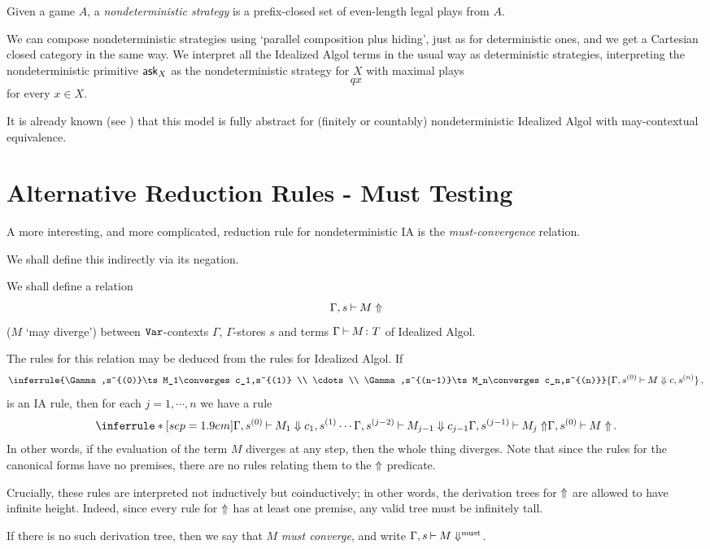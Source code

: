 \documentclass[11pt]{report}
\begin{document}
\begin{definition}
  Given a game $A$, a \emph{nondeterministic strategy} is a prefix-closed set of even-length legal plays from $A$.
\end{definition}

We can compose nondeterministic strategies using `parallel composition plus hiding', just as for deterministic ones, and we get a Cartesian closed category in the same way.  
We interpret all the Idealized Algol terms in the usual way as deterministic strategies, interpreting the nondeterministic primitive $\operatorname{{\mathsf{ask}}}_X$ as the nondeterministic strategy for $X$ with maximal plays
\[
  qx
  \]
for every $x\in X$.

It is already known (see \cite{mcCHFiniteND}) that this model is fully abstract for (finitely or countably) nondeterministic Idealized Algol with may-contextual equivalence.

\section{Alternative Reduction Rules - Must Testing}

A more interesting, and more complicated, reduction rule for nondeterministic IA is the \emph{must-convergence} relation.

We shall define this indirectly via its negation.

\begin{definition}
  We shall define a relation
  \[
    \Gamma,s\mathbin{\vdash} M\Uparrow
    \]
  ($M$ `may diverge') between ${\mathtt{Var}}$-contexts $\Gamma$, $\Gamma$-stores $s$ and terms $\Gamma\mathbin{\vdash} M\colon T$ of Idealized Algol.

  The rules for this relation may be deduced from the rules for Idealized Algol.  
  If
  \[
    \inferrule{\Gamma,s^{(0)}\ts M_1\converges c_1,s^{(1)} \\ \cdots \\ \Gamma,s^{(n-1)}\ts M_n\converges c_n,s^{(n)}}
    {\Gamma,s^{(0)} \ts M \converges c,s^{(n)}}\,,
    \]
  is an IA rule, then for each $j=1,\cdots,n$ we have a rule
  \[
    \inferrule*[sep=1.9em]{\Gamma,s^{(0)}\ts M_1 \converges c_1,s^{(1)} \\ \cdots \\ \Gamma,s^{(j-2)} \ts M_{j-1} \converges c_{j-1} \\ \Gamma,s^{(j-1)}\ts M_j\diverges}
    {\Gamma,s^{(0)} \ts M \diverges}\,.
    \]
  In other words, if the evaluation of the term $M$ diverges at any step, then the whole thing diverges.  
  Note that since the rules for the canonical forms have no premises, there are no rules relating them to the $\Uparrow$ predicate.

  Crucially, these rules are interpreted not inductively but coinductively; in other words, the derivation trees for $\Uparrow$ are allowed to have infinite height.
  Indeed, since every rule for $\Uparrow$ has at least one premise, any valid tree must be infinitely tall.

  If there is no such derivation tree, then we say that $M$ \emph{must converge}, and write $\Gamma,s\mathbin{\vdash} M\Downarrow^{\text{must}}$.
  \label{DefMayDivergence}
\end{definition}
\end{document}
